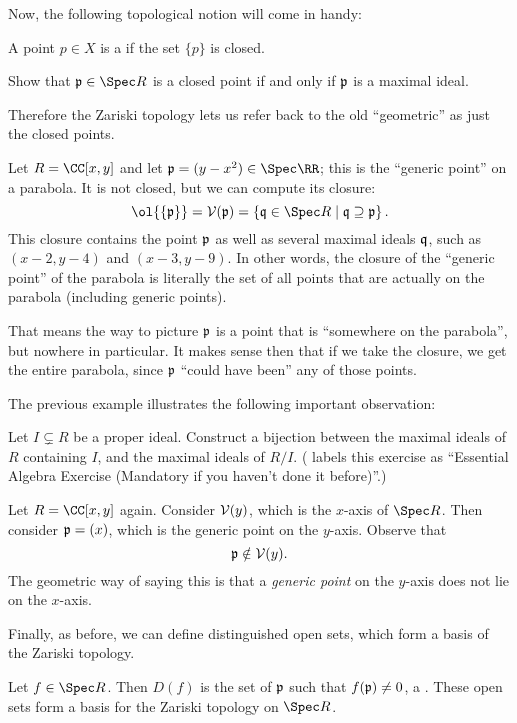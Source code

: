 \documentclass[11pt]{scrreprt}
\begin{document}
Now, the following topological notion will come in handy:
\begin{definition}
	A point $p \in X$ is a  if the set $\{p\}$ is closed.
\end{definition}
\begin{ques}
	Show that $\pp \in \Spec R$ is a closed point
	if and only if $\mathfrak p$ is a maximal ideal.
\end{ques}
Therefore the Zariski topology lets us refer back to the old ``geometric''
as just the closed points.
\begin{example}
	Let $R = \CC[x,y]$ and let $\pp = (y-x^2) \in \Spec \RR$;
	this is the ``generic point'' on a parabola.
	It is not closed, but we can compute its closure:
	\[
		\ol{\{\pp\}}
		= \VV(\pp) = \left\{ \qq \in \Spec R \mid \qq \supseteq \pp \right\}.
	\]
	This closure contains the point $\mathfrak p$ as well
	as several maximal ideals $\mathfrak q$, such as $(x-2,y-4)$ and $(x-3,y-9)$.
	In other words, the closure of the ``generic point'' of the parabola
	is literally the set of all points that are actually on the parabola
	(including generic points).

	That means the way to picture $\mathfrak p$ is a point that 
	is ``somewhere on the parabola'', but nowhere in particular.
	It makes sense then that if we take the closure,
	we get the entire parabola,
	since $\mathfrak p$ ``could have been'' any of those points.
\end{example}
The previous example illustrates the following important observation:
\begin{exercise}
	Let $I \subsetneq R$ be a proper ideal.
	Construct a bijection between the maximal ideals of $R$ containing $I$,
	and the maximal ideals of $R/I$.
	(\cite{ref:vakil} labels this exercise as
	``Essential Algebra Exercise (Mandatory if you haven't done it before)''.)
\end{exercise}

\begin{example}
	Let $R = \CC[x,y]$ again.
	Consider $\mathcal V(y)$, which is the $x$-axis of $\Spec R$.
	Then consider $\mathfrak p = (x)$, which is the generic point on the $y$-axis.
	Observe that
	\[ \mathfrak p \notin \mathcal V(y). \]
	The geometric way of saying this is that a \emph{generic point}
	on the $y$-axis does not lie on the $x$-axis.
\end{example}

Finally, as before, we can define distinguished open sets,
which form a basis of the Zariski topology.
\begin{definition}
	Let $f \in \Spec R$.
	Then $D(f)$ is the set of $\mathfrak p$ such that $f(\mathfrak p) \neq 0$,
	a .
	These open sets form a basis for the Zariski topology on $\Spec R$.
\end{definition}
\end{document}
